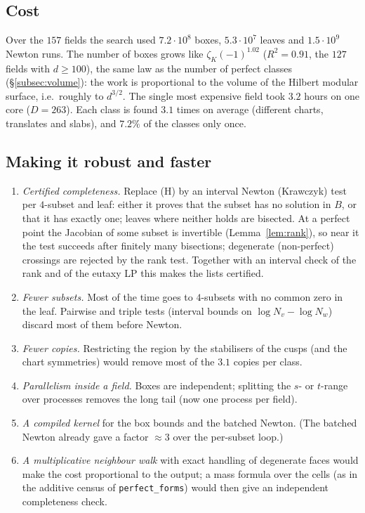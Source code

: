 \documentclass[11pt]{amsart}
\theoremstyle{definition}
\theoremstyle{remark}
\begin{document}
\subsection{Cost}\label{subsec:cost}
Over the $157$ fields the search used $7.2\cdot10^8$ boxes, $5.3\cdot10^7$ leaves and
$1.5\cdot10^9$ Newton runs.  The number of boxes grows like $\zeta_K(-1)^{1.02}$ ($R^2=0.91$,
the $127$ fields with $d\ge100$), the same law as the number of perfect classes
(\S\ref{subsec:volume}): the work is proportional to the volume of the Hilbert modular
surface, i.e.\ roughly to $d^{3/2}$.  The single most expensive field took $3.2$ hours on one
core ($D=263$).  Each class is found $3.1$ times on average (different charts, translates and
slabs), and $7.2\%$ of the classes only once.

\subsection{Making it robust and faster}\label{subsec:improve}
\begin{enumerate}[leftmargin=*]
\item \emph{Certified completeness.}  Replace (H) by an interval Newton (Krawczyk) test per
$4$-subset and leaf: either it proves that the subset has no solution in $B$, or that it has
exactly one; leaves where neither holds are bisected.  At a perfect point the Jacobian of
some subset is invertible (Lemma~\ref{lem:rank}), so near it the test succeeds after finitely
many bisections; degenerate (non-perfect) crossings are rejected by the rank test.  Together
with an interval check of the rank and of the eutaxy LP this makes the lists certified.
\item \emph{Fewer subsets.}  Most of the time goes to $4$-subsets with no common zero in the
leaf.  Pairwise and triple tests (interval bounds on $\log N_v-\log N_w$) discard most of them
before Newton.
\item \emph{Fewer copies.}  Restricting the region by the stabilisers of the cusps (and the
chart symmetries) would remove most of the $3.1$ copies per class.
\item \emph{Parallelism inside a field.}  Boxes are independent; splitting the $s$- or
$t$-range over processes removes the long tail (now one process per field).
\item \emph{A compiled kernel} for the box bounds and the batched Newton.  (The batched Newton
already gave a factor $\approx3$ over the per-subset loop.)
\item \emph{A multiplicative neighbour walk} with exact handling of degenerate faces would make
the cost proportional to the output; a mass formula over the cells (as in the additive census
of \texttt{perfect\_forms}) would then give an independent completeness check.
\end{enumerate}
\end{document}
